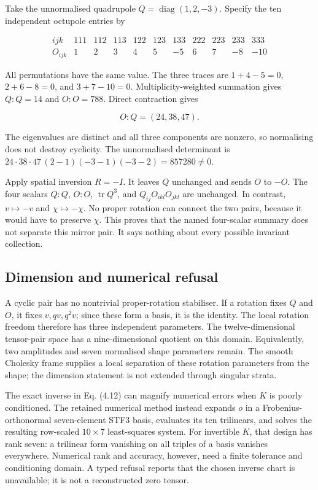 \documentclass[
  11pt,
  a4paper]{article}
\begin{document}
Take the unnormalised quadrupole \(Q=\operatorname{diag}(1,2,-3)\). Specify the ten independent octupole entries by

\[
\begin{array}{c|rrrrrrrrrr}
ijk&111&112&113&122&123&133&222&223&233&333\\\hline
O_{ijk}&1&2&3&4&5&-5&6&7&-8&-10
\end{array}
\tag{4.14}
\]

All permutations have the same value. The three traces are \(1+4-5=0\), \(2+6-8=0\), and \(3+7-10=0\). Multiplicity-weighted summation gives \(Q:Q=14\) and \(O:O=788\). Direct contraction gives

\[
O:Q=(24,38,47).
\tag{4.15}
\]

The eigenvalues are distinct and all three components are nonzero, so normalising does not destroy cyclicity. The unnormalised determinant is
\(24\cdot38\cdot47\,(2-1)(-3-1)(-3-2)=857280\ne0\).

Apply spatial inversion \(R=-I\). It leaves \(Q\) unchanged and sends \(O\) to \(-O\). The four scalars
\(Q:Q\), \(O:O\), \(\operatorname{tr}Q^3\), and \(Q_{ij}O_{ikl}O_{jkl}\) are unchanged. In contrast, \(v\mapsto-v\) and \(\chi\mapsto-\chi\). No proper rotation can connect the two pairs, because it would have to preserve \(\chi\). This proves that the named four-scalar summary does not separate this mirror pair. It says nothing about every possible invariant collection.

\hypertarget{dimension-and-numerical-refusal}{%
\subsection{Dimension and numerical refusal}\label{dimension-and-numerical-refusal}}

A cyclic pair has no nontrivial proper-rotation stabiliser. If a rotation fixes \(Q\) and \(O\), it fixes \(v,qv,q^2v\); since these form a basis, it is the identity. The local rotation freedom therefore has three independent parameters. The twelve-dimensional tensor-pair space has a nine-dimensional quotient on this domain. Equivalently, two amplitudes and seven normalised shape parameters remain. The smooth Cholesky frame supplies a local separation of these rotation parameters from the shape; the dimension statement is not extended through singular strata.

The exact inverse in Eq. (4.12) can magnify numerical errors when \(K\) is poorly conditioned. The retained numerical method instead expands \(o\) in a Frobenius-orthonormal seven-element STF3 basis, evaluates its ten trilinears, and solves the resulting row-scaled \(10\times7\) least-squares system. For invertible \(K\), that design has rank seven: a trilinear form vanishing on all triples of a basis vanishes everywhere. Numerical rank and accuracy, however, need a finite tolerance and conditioning domain. A typed refusal reports that the chosen inverse chart is unavailable; it is not a reconstructed zero tensor.
\end{document}
